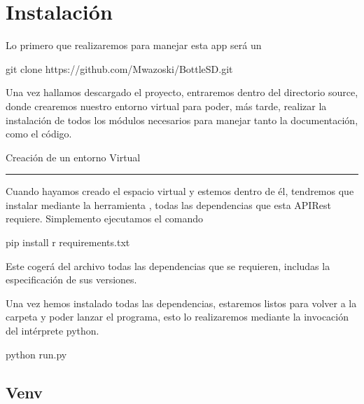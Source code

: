 \documentclass[letterpaper,10pt,spanish]{sphinxmanual}
\begin{document}
\section{Instalación}
\label{\detokenize{documentos/instalacion:instalacion}}
\sphinxAtStartPar
Lo primero que realizaremos para manejar esta app será un 

\begin{sphinxVerbatim}[commandchars=\\\{\}]
\PYGZdl{} git clone https://github.com/Mwazoski/Bottle\PYGZhy{}SD.git
\end{sphinxVerbatim}

\sphinxAtStartPar
Una vez hallamos descargado el proyecto, entraremos dentro del directorio source, donde crearemos nuestro
entorno virtual para poder, más tarde, realizar la instalación de todos los módulos necesarios para manejar
tanto la documentación, como el código.

\sphinxAtStartPar
Creación de un entorno Virtual {\hyperref[\detokenize{documentos/instalacion:venv}]{}}


\bigskip\hrule\bigskip


\sphinxAtStartPar
Cuando hayamos creado el espacio virtual y estemos dentro de él, tendremos que instalar mediante la herramienta , todas las
dependencias que esta APIRest requiere. Simplemento ejecutamos el comando

\begin{sphinxVerbatim}[commandchars=\\\{\}]
\PYGZdl{} pip install \PYGZhy{}r requirements.txt
\end{sphinxVerbatim}

\sphinxAtStartPar
Este cogerá del archivo  todas las dependencias que se requieren, includas la especificación de sus versiones.

\sphinxAtStartPar
Una vez hemos instalado todas las dependencias, estaremos listos para volver a la carpeta  y poder lanzar el programa,
esto lo realizaremos mediante la invocación del intérprete python.

\begin{sphinxVerbatim}[commandchars=\\\{\}]
\PYGZdl{} python run.py
\end{sphinxVerbatim}


\subsection{Venv}
\label{\detokenize{documentos/instalacion:venv}}
\sphinxAtStartPar
{}
\end{document}
